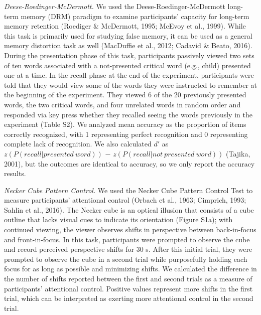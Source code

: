 \documentclass[
  english,
  pub,floatsintext]{apa6}
\begin{document}
\emph{Deese-Roedinger-McDermott.}
We used the Deese-Roedinger-McDermott long-term memory (DRM) paradigm to examine participants' capacity for long-term memory retention (Roediger \& McDermott, 1995; McEvoy et al., 1999). While this task is primarily used for studying false memory, it can be used as a general memory distortion task as well (MacDuffie et al., 2012; Cadavid \& Beato, 2016). During the presentation phase of this task, participants passively viewed two sets of ten words associated with a not-presented critical word (e.g., child) presented one at a time. In the recall phase at the end of the experiment, participants were told that they would view some of the words they were instructed to remember at the beginning of the experiment. They viewed 6 of the 20 previously presented words, the two critical words, and four unrelated words in random order and responded via key press whether they recalled seeing the words previously in the experiment (Table S2). We analyzed mean accuracy as the proportion of items correctly recognized, with 1 representing perfect recognition and 0 representing complete lack of recognition. We also calculated \(d'\) as \(z(P(recall|presented\ word))\) \(-\) \(z(P(recall|not\ presented\ word))\) (Tajika, 2001), but the outcomes are identical to accuracy, so we only report the accuracy results.

\emph{Necker Cube Pattern Control.}
We used the Necker Cube Pattern Control Test to measure participants' attentional control (Orbach et al., 1963; Cimprich, 1993; Sahlin et al., 2016). The Necker cube is an optical illusion that consists of a cube outline that lacks visual cues to indicate its orientation (Figure S1a); with continued viewing, the viewer observes shifts in perspective between back-in-focus and front-in-focus. In this task, participants were prompted to observe the cube and record perceived perspective shifts for 30 s. After this initial trial, they were prompted to observe the cube in a second trial while purposefully holding each focus for as long as possible and minimizing shifts. We calculated the difference in the number of shifts reported between the first and second trials as a measure of participants' attentional control. Positive values represent more shifts in the first trial, which can be interpreted as exerting more attentional control in the second trial.
\end{document}
